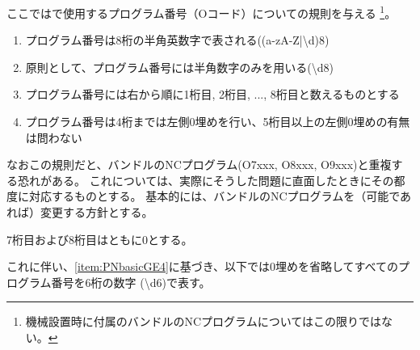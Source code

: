 

ここでは\DMC で使用するプログラム番号（Oコード）についての規則を与える
\footnote{機械設置時に付属のバンドルのNCプログラムについてはこの限りではない。}。



\begin{enumerate}[label=\Roman*., ref=\Roman*]
\item プログラム番号は8桁の半角英数字で表される({\ttfamily(a-zA-Z|\textbackslash d){8}})
\item 原則として、プログラム番号には半角数字のみを用いる({\ttfamily\textbackslash d{8}})
\item プログラム番号には右から順に1桁目, 2桁目, ..., 8桁目と数えるものとする
\item\label{item:PNbasicGE4}プログラム番号は4桁までは左側0埋めを行い、5桁目以上の左側0埋めの有無は問わない
\end{enumerate}
\begin{hosoku}
なおこの規則だと、バンドルのNCプログラム(O7xxx, O8xxx, O9xxx)と重複する恐れがある。
これについては、実際にそうした問題に直面したときにその都度に対応するものとする。
基本的には、バンドルのNCプログラムを（可能であれば）変更する方針とする。
\end{hosoku}


7桁目および8桁目はともに0とする。

これに伴い、\ref{item:PNbasicGE4}に基づき、以下では0埋めを省略してすべてのプログラム番号を6桁の数字 ({\ttfamily\textbackslash d{6}})で表す。


